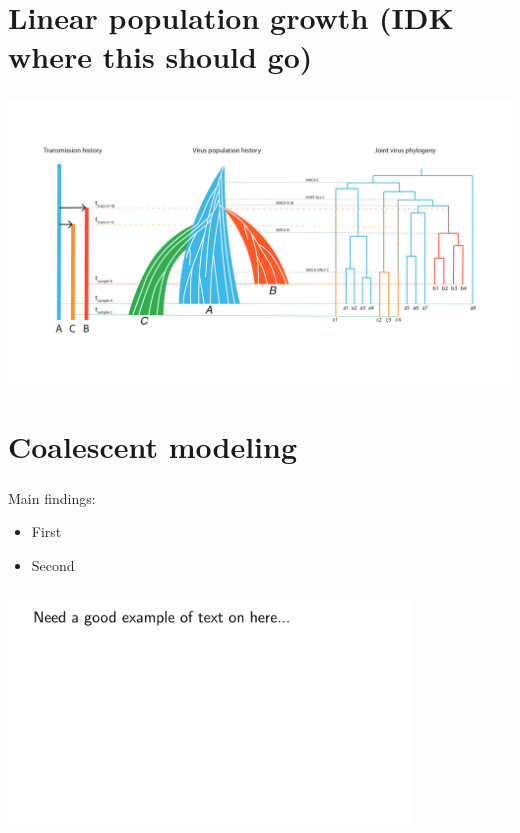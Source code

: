 \documentclass[aspectratio=169]{beamer}
\begin{document}
\section{Linear population growth (IDK where this should go)}

\begin{frame} \frametitle{\insertsection}
    \centering\includegraphics[width=\textwidth]{images/thomas-figure}
\end{frame}

\section{Coalescent modeling}

\begin{frame} \frametitle{\insertsection}

    Main findings:
    \begin{itemize}
        \item First
        \item Second
    \end{itemize}

\end{frame}

\begin{frame} \frametitle{\insertsection}
    \centering\includegraphics[width=0.8\textwidth]{images/example}
\end{frame}
\end{document}
